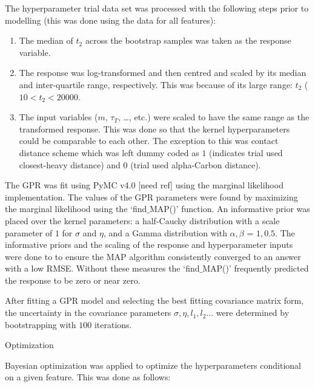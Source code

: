 The hyperparameter trial data set was processed with the following steps prior to modelling (this was done using the data for all features):
\begin{enumerate}
    \item The median of $t_2$ across the bootstrap samples was taken as the response variable. 
    \item The response  was log-transformed and then centred and scaled by its median and inter-quartile range, respectively. This was because of its large range: $t_2$ ($10 < t_2 < \num{20000}$. 
    \item The input variables ($m$, $\tau_{T}$, \ldots, etc.) were scaled to have the same range as the transformed response. This was done so that the kernel hyperparameters could be comparable to each other. The exception to this was contact distance scheme which was left dummy coded as $1$ (indicates trial used closest-heavy distance) and $0$ (trial used alpha-Carbon distance). 
\end{enumerate}

The GPR was fit using PyMC v4.0 [need ref] using the marginal likelihood implementation.  The values of the GPR parameters were found by maximizing the marginal likelihood using the `find$\_$MAP()' function. An informative prior was placed over the kernel parameters: a half-Cauchy distribution with a scale parameter of $1$ for $\sigma$ and $\eta$, and a Gamma distribution with $\alpha, \beta$ = $1, 0.5$. The informative priors and the scaling of the response and hyperparameter inputs were done to to ensure the MAP algorithm consistently converged to an answer with a low RMSE. Without these measures the `find$\_$MAP()' frequently predicted the response to be zero or near zero. 

After fitting a GPR model and selecting the best fitting covariance matrix form, the uncertainty in the covariance parameters $\sigma, \eta, l_{1}, l_{2}\ldots$ were determined by bootstrapping with $100$ iterations. 

Optimization 

Bayesian optimization was applied to optimize the hyperparameters conditional on a given feature. This was done as follows: 

